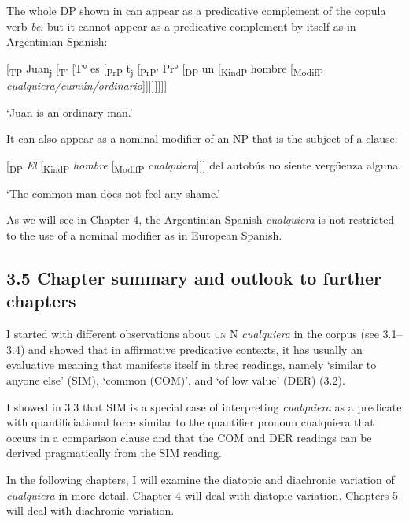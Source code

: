 \documentclass[output=paper]{langscibook}
\begin{document}
The whole DP shown in  can appear as a predicative complement of the copula verb \textit{be}, but it cannot appear as a predicative complement by itself as in Argentinian Spanish:

  [\textsubscript{TP} Juan\textsubscript{j} [\textsubscript{T'} [T° es [\textsubscript{PrP} t\textsubscript{j} [\textsubscript{PrP'} Pr°\textsubscript{} [\textsubscript{DP} un [\textsubscript{KindP} hombre [\textsubscript{ModifP} \textit{cualquiera/cumún/ordinario}]]]]]]]]

  ‘Juan is an ordinary man.’

It can also appear as a nominal modifier of an NP that is the subject of a clause:

  [\textsubscript{DP} \textit{El} [\textsubscript{KindP} \textit{hombre} [\textsubscript{ModifP} \textit{cualquiera}]]] del autobús no siente vergüenza alguna.

  ‘The common man does not feel any shame.’

As we will see in Chapter 4, the Argentinian Spanish \textit{cualquiera} is not restricted to the use of a nominal modifier as in European Spanish. 

\subsection{\textbf{3.5} \textbf{Chapter} \textbf{summary} \textbf{and} \textbf{outlook} \textbf{to} \textbf{further} \textbf{chapters}}

I started with different observations about \textsc{un} N \textit{cualquiera} in the corpus (see 3.1–3.4) and showed that in affirmative predicative contexts, it has usually an evaluative meaning that manifests itself in three readings, namely ‘similar to anyone else’ (SIM), ‘common (COM)’, and ‘of low value’ (DER) (3.2). 

  I showed in 3.3 that SIM is a special case of interpreting \textit{cualquiera} as a predicate with quantificiational force similar to the quantifier pronoun cualquiera that occurs in a comparison clause and that the COM and DER readings can be derived pragmatically from the SIM reading. 

  In the following chapters, I will examine the diatopic and diachronic variation of \textit{cualquiera} in more detail. Chapter 4 will deal with diatopic variation. Chapters 5 will deal with diachronic variation. 
\end{document}
